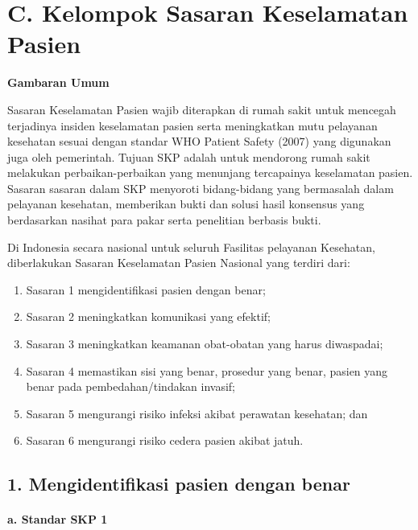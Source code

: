 \documentclass[
]{book}
\providecommand{\tightlist}{%
  \setlength{\itemsep}{0pt}\setlength{\parskip}{0pt}}
\begin{document}
\hypertarget{c.-kelompok-sasaran-keselamatan-pasien}{%
\chapter*{C. Kelompok Sasaran Keselamatan Pasien}\label{c.-kelompok-sasaran-keselamatan-pasien}}

\textbf{Gambaran Umum}

Sasaran Keselamatan Pasien wajib diterapkan di rumah sakit untuk mencegah terjadinya insiden keselamatan pasien serta meningkatkan mutu pelayanan kesehatan sesuai dengan standar WHO Patient Safety (2007) yang digunakan juga oleh pemerintah. Tujuan SKP adalah untuk mendorong rumah sakit melakukan perbaikan-perbaikan yang menunjang tercapainya keselamatan pasien. Sasaran sasaran dalam SKP menyoroti bidang-bidang yang bermasalah dalam pelayanan kesehatan, memberikan bukti dan solusi hasil konsensus yang berdasarkan nasihat para pakar serta penelitian berbasis bukti.

Di Indonesia secara nasional untuk seluruh Fasilitas pelayanan Kesehatan, diberlakukan Sasaran Keselamatan Pasien Nasional yang terdiri dari:

\begin{enumerate}
\def\labelenumi{\arabic{enumi}.}
\tightlist
\item
  Sasaran 1 mengidentifikasi pasien dengan benar;
\item
  Sasaran 2 meningkatkan komunikasi yang efektif;
\item
  Sasaran 3 meningkatkan keamanan obat-obatan yang harus diwaspadai;
\item
  Sasaran 4 memastikan sisi yang benar, prosedur yang benar, pasien yang benar pada pembedahan/tindakan invasif;
\item
  Sasaran 5 mengurangi risiko infeksi akibat perawatan kesehatan; dan
\item
  Sasaran 6 mengurangi risiko cedera pasien akibat jatuh.
\end{enumerate}

\hypertarget{mengidentifikasi-pasien-dengan-benar}{%
\section*{1. Mengidentifikasi pasien dengan benar}\label{mengidentifikasi-pasien-dengan-benar}}

\hypertarget{a.-standar-skp-1}{%
\subsubsection*{a. Standar SKP 1}\label{a.-standar-skp-1}}
\end{document}
